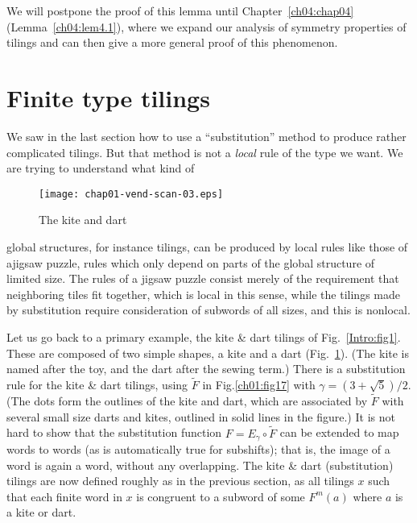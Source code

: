 \documentclass[reqno]{stml-l}
\theoremstyle{plain}
\theoremstyle{definition}
\numberwithin{equation}{chapter}
\begin{document}
We will postpone the proof of this lemma until Chapter~\ref{ch04:chap04} (Lemma~\ref{ch04:lem4.1}), where we expand our analysis of symmetry properties of tilings and can then give a more general proof of this phenomenon.

\section{Finite type tilings}\label{ch01:sec4}

We saw in the last section how to use a ``substitution'' method to produce rather complicated tilings. But that method is not a \emph{local} rule of the type we want. We are trying to understand what kind of
\begin{figure}[!h]
\texttt{[image: chap01-vend-scan-03.eps]}
\caption{The kite and dart}\label{ch01:fig16}
\end{figure}

\noindent global structures, for instance tilings, can be produced by local rules like those of ajigsaw puzzle, rules which only depend on parts of the global structure of limited size. The rules of a jigsaw puzzle consist merely of the requirement that neighboring tiles fit together, which is local in this sense, while the tilings made by substitution require consideration of subwords of all sizes, and this is nonlocal.

Let us go back to a primary example, the kite \& dart tilings of Fig.~\ref{Intro:fig1}. These are composed of two simple shapes, a kite and a dart (Fig.~\ref{ch01:fig16}). (The kite is named after the toy, and the dart after the sewing term.) There is a substitution rule for the kite \& dart tilings, using $\tilde{F}$ in Fig.\ref{ch01:fig17} with $\gamma=(3+\sqrt{5})/2$. (The dots form the outlines of the kite and dart, which are associated by $\tilde{F}$ with several small size darts and kites, outlined in solid lines in the figure.) It is not hard to show that the substitution function $F=E_{\gamma}\circ\tilde{F}$ can be extended to map words to words (as is automatically true for subshifts); that is, the image of a word is again a word, without any overlapping. The kite \& dart (substitution) tilings are now defined roughly as in the previous section, as all tilings $x$ such that each finite word in $x$ is congruent to a subword of some $F^{m}(a)$ where $a$ is a kite or dart.
\end{document}
